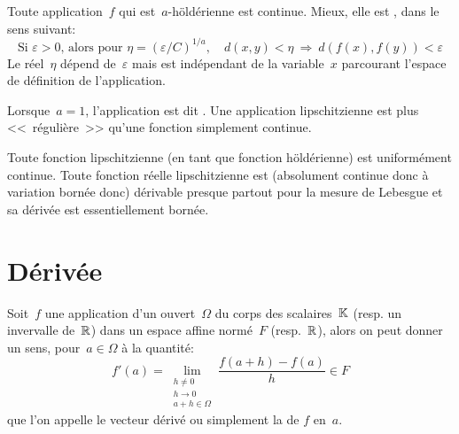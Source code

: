 \medskip
\begin{theoreme}
Toute application~$f$ qui est~$a$-höldérienne est continue. Mieux, elle est
, dans le sens suivant:
\begin{equation}
\text{Si } \varepsilon>0\text{, alors pour } \eta = \left( \varepsilon / C \right)^{1 / a},\quad d\left( x, y \right) < \eta \ \Rightarrow\ d\left( f(x), f(y) \right) < \varepsilon
\end{equation}
Le réel~$\eta$ dépend de~$\varepsilon$ mais est indépendant de la variable~$x$
parcourant l'espace de définition de l'application.
\end{theoreme}
\begin{definition}
Lorsque~$a = 1$, l'application est dit .
Une application lipschitzienne est plus <<~régulière~>> qu'une fonction
simplement continue.
\end{definition}
\medskip
Toute fonction lipschitzienne (en tant que fonction höldérienne) est uniformément continue.
\medskip
Toute fonction réelle lipschitzienne est (absolument continue donc à variation bornée donc)
dérivable presque partout pour la mesure de Lebesgue et sa dérivée est essentiellement bornée.
\medskip
\section{Dérivée}
\medskip
\begin{definition}
Soit~$f$ une application d'un ouvert~$\Omega$ du corps des scalaires~$\mathbb K$ (resp. un invervalle
de~$\mathbb R$) dans un espace affine normé~$F$ (resp.~$\mathbb R$), alors on peut donner un sens,
pour~$a\in\Omega$ à la quantité:
\begin{equation}
f'(a)=\lim_{\substack{h\ne0\\h\to0\\a+h\in\Omega}} \dfrac{f(a+h)-f(a)}h \in F
\end{equation}
que l'on appelle le vecteur dérivé ou simplement la  de
$f$ en~$a$.
\end{definition}


